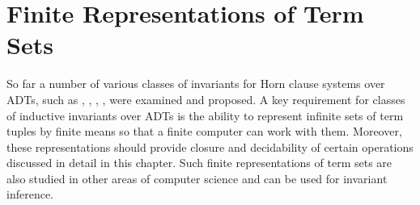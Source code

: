 \section{Finite Representations of Term Sets}\label{sec:relatedWork/modelBuilding}
So far a number of various classes of invariants for Horn clause systems over ADTs, such as \elemclass{}, \regclass{}, \syncRegFlatClass{}, \syncRegFullClass{}, were examined and proposed. A key requirement for classes of inductive invariants over ADTs is the ability to represent infinite sets of term tuples by finite means so that a finite computer can work with them. Moreover, these representations should provide closure and decidability of certain operations discussed in detail in this chapter. Such finite representations of term sets are also studied in other areas of computer science and can be used for invariant inference.

